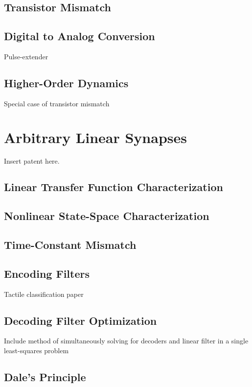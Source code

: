 \subsection{Transistor Mismatch}

\subsection{Digital to Analog Conversion}

Pulse-extender

\subsection{Higher-Order Dynamics}

Special case of transistor mismatch


\section{Arbitrary Linear Synapses}

Insert patent here.

\subsection{Linear Transfer Function Characterization}

\subsection{Nonlinear State-Space Characterization}

\subsection{Time-Constant Mismatch}

\subsection{Encoding Filters}

Tactile classification paper

\subsection{Decoding Filter Optimization}

Include method of simultaneously solving for decoders and linear filter in a single least-squares problem

\subsection{Dale's Principle}


